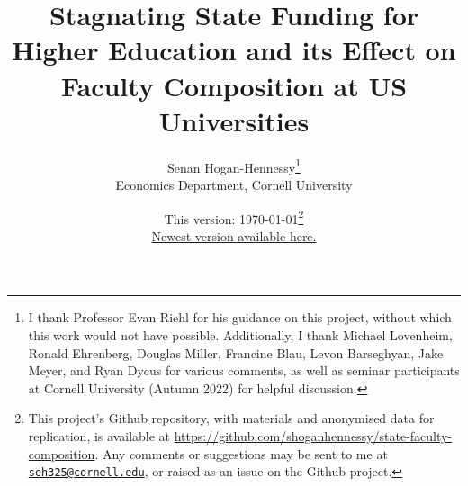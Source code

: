 \documentclass[notitlepage,12pt]{article}
\author{Senan Hogan-Hennessy\thanks{
        I thank Professor Evan Riehl for his guidance on this project, without which this work would not have possible.
        Additionally, I thank Michael Lovenheim, Ronald Ehrenberg, Douglas Miller, Francine Blau, Levon Barseghyan, Jake Meyer, and Ryan Dycus for various comments, as well as seminar participants at Cornell University (Autumn 2022) for helpful discussion.} \\
    \vspace{0.1cm}
    Economics Department, Cornell University
}
\title{Stagnating State Funding for Higher Education and its Effect on Faculty Composition at US Universities
    }
\date{This version: \today\thanks{
    This project's Github repository, with materials and anonymised data for replication, is available at 
    \url{https://github.com/shoganhennessy/state-faculty-composition}.
    Any comments or suggestions may be sent to me at \href{mailto:seh325@cornell.edu}{\nolinkurl{seh325@cornell.edu}}, or raised as an issue on the Github project.
    } \\ \vspace{0.1cm}
    \href{https://github.com/shoganhennessy/state-faculty-composition/blob/main/state-faculty-composition-2023.pdf}{Newest version available here.}
}
\begin{document}
\maketitle
\thispagestyle{empty}
\begin{abstract}
    \noindent
    
\end{abstract}

\newpage
\setcounter{page}{1}
\doublespacing
\noindent








\singlespacing



\end{document}
